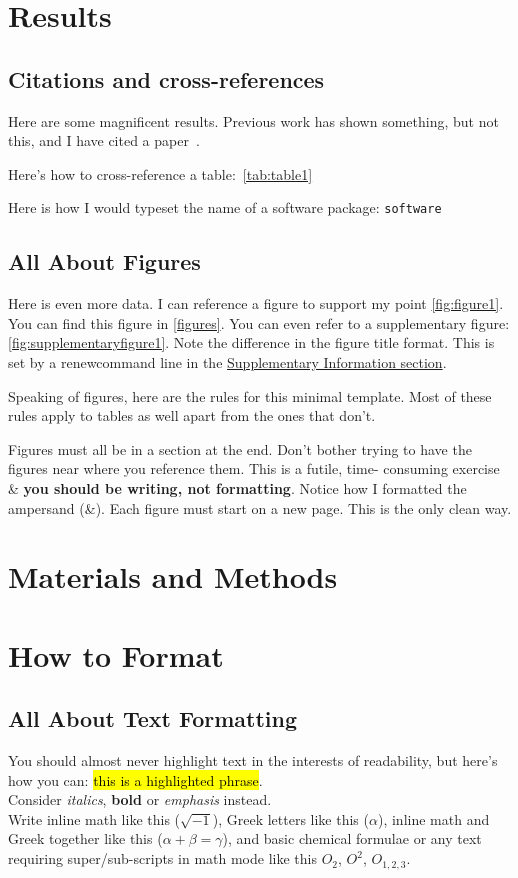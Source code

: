 \documentclass{getwriting}
\begin{document}
\section{Results}\label{results}
\subsection{Citations and cross-references}
Here are some magnificent results. Previous work has shown something, but not this, and I have cited a paper~\cite{scbonita}. 
\par
Here's how to cross-reference a table:~\hyperref[tab:table1]{\autoref{tab:table1}}
\par
Here is how I would typeset the name of a software package: \lstinline{software}
\subsection{All About Figures}
Here is even more data. I can reference a figure to support my point \hyperref[fig:figure1]{\autoref{fig:figure1}}.
You can find this figure in \hyperref[figures]{\autoref{figures}}. You can even refer to a supplementary figure: \hyperref[fig:supplementaryfigure1]{\autoref{fig:supplementaryfigure1}}. Note the difference in the figure title format. This is set by a renewcommand line in the \hyperref[suppinfo]{Supplementary Information section}.
\par
Speaking of figures, here are the rules for this minimal template. Most of these rules apply to tables as well apart from the ones that don't.
\begin{outline}
    \1 Figures must all be in a section at the end. Don't bother trying to have the figures near where you reference them. This is a futile, time- consuming exercise \& \textbf{you should be writing, not formatting}. Notice how I formatted the ampersand (\&).
    \1 Each figure must start on a new page. This is the only clean way.
\end{outline}

\section{Materials and Methods}
\section{How to Format}
\subsection{All About Text Formatting}
You should almost never highlight text in the interests of readability, but here's how you can: \hl{this is a highlighted phrase}.\\
Consider \textit{italics}, \textbf{bold} or \emph{emphasis} instead.\\
Write inline math like this ($\sqrt{-1}$), Greek letters like this ($\alpha$), inline math and Greek together like this ($\alpha + \beta = \gamma$), and basic chemical formulae or any text requiring super/sub-scripts in math mode like this $O_2$, $O^2$, $O_{1,2,3}$. 
\end{document}
